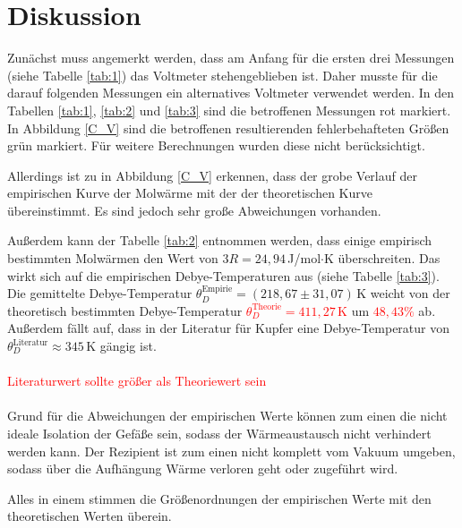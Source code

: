 \section{Diskussion}
Zunächst muss angemerkt werden, dass am Anfang für die ersten drei Messungen (siehe Tabelle \ref{tab:1}) das Voltmeter stehengeblieben ist.
Daher musste für die darauf folgenden Messungen ein alternatives Voltmeter verwendet werden.
In den Tabellen \ref{tab:1}, \ref{tab:2} und \ref{tab:3} sind die betroffenen Messungen rot markiert.
In Abbildung \ref{C_V} sind die betroffenen resultierenden fehlerbehafteten Größen grün markiert.
Für weitere Berechnungen wurden diese nicht berücksichtigt.

Allerdings ist zu in Abbildung \ref{C_V} erkennen,
dass der grobe Verlauf der empirischen Kurve der Molwärme
mit der der theoretischen Kurve übereinstimmt.
Es sind jedoch sehr große Abweichungen vorhanden.

Außerdem kann der Tabelle \ref{tab:2} entnommen werden,
dass einige empirisch bestimmten Molwärmen den Wert von $3R = 24,94$\,J/mol$\cdot$K überschreiten.
Das wirkt sich auf die empirischen Debye-Temperaturen aus (siehe Tabelle \ref{tab:3}).
Die gemittelte Debye-Temperatur $\theta_D^{\text{Empirie}} = (218,67\pm31,07)$\,K
weicht von der theoretisch bestimmten Debye-Temperatur \textcolor{red}{$\theta_D^{\text{Theorie}} = 411,27$\,K}
um \textcolor{red}{$48,43\%$} ab.
Außerdem fällt auf, dass in der Literatur für Kupfer eine Debye-Temperatur von $\theta_D^{\text{Literatur}} \approx 345$\,K \cite{debye} gängig ist.
\\
\\
\textcolor{red}{Literaturwert sollte größer als Theoriewert sein}
\\
\\
Grund für die Abweichungen der empirischen Werte können zum einen die nicht ideale Isolation der Gefäße sein,
sodass der Wärmeaustausch nicht verhindert werden kann.
Der Rezipient ist zum einen nicht komplett vom Vakuum umgeben, sodass über die Aufhängung Wärme verloren geht oder zugeführt wird.


Alles in einem stimmen die Größenordnungen der empirischen Werte mit den theoretischen Werten überein.
